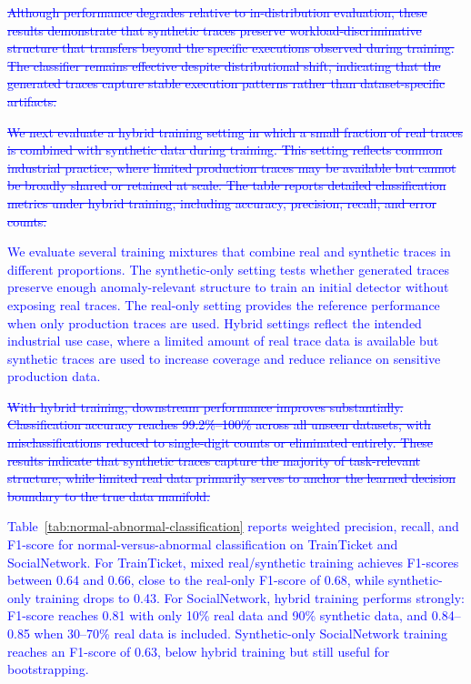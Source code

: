 \documentclass[sigconf,review]{acmart}
\begin{document}
\textcolor{blue}{\sout{Although performance degrades relative to in-distribution evaluation, these results demonstrate that synthetic traces preserve workload-discriminative structure that transfers beyond the specific executions observed during training. The classifier remains effective despite distributional shift, indicating that the generated traces capture stable execution patterns rather than dataset-specific artifacts.}}

\textcolor{blue}{\sout{We next evaluate a hybrid training setting in which a small fraction of real traces is combined with synthetic data during training. This setting reflects common industrial practice, where limited production traces may be available but cannot be broadly shared or retained at scale. The table reports detailed classification metrics under hybrid training, including accuracy, precision, recall, and error counts.}}

\textcolor{blue}{We evaluate several training mixtures that combine real and synthetic traces in different proportions. The synthetic-only setting tests whether generated traces preserve enough anomaly-relevant structure to train an initial detector without exposing real traces. The real-only setting provides the reference performance when only production traces are used. Hybrid settings reflect the intended industrial use case, where a limited amount of real trace data is available but synthetic traces are used to increase coverage and reduce reliance on sensitive production data.}

\textcolor{blue}{\sout{With hybrid training, downstream performance improves substantially. Classification accuracy reaches 99.2\%--100\% across all unseen datasets, with misclassifications reduced to single-digit counts or eliminated entirely. These results indicate that synthetic traces capture the majority of task-relevant structure, while limited real data primarily serves to anchor the learned decision boundary to the true data manifold.}}

\textcolor{blue}{Table~\ref{tab:normal-abnormal-classification} reports weighted precision, recall, and F1-score for normal-versus-abnormal classification on TrainTicket and SocialNetwork. For TrainTicket, mixed real/synthetic training achieves F1-scores between 0.64 and 0.66, close to the real-only F1-score of 0.68, while synthetic-only training drops to 0.43. For SocialNetwork, hybrid training performs strongly: F1-score reaches 0.81 with only 10\% real data and 90\% synthetic data, and 0.84--0.85 when 30--70\% real data is included. Synthetic-only SocialNetwork training reaches an F1-score of 0.63, below hybrid training but still useful for bootstrapping.}
\end{document}
